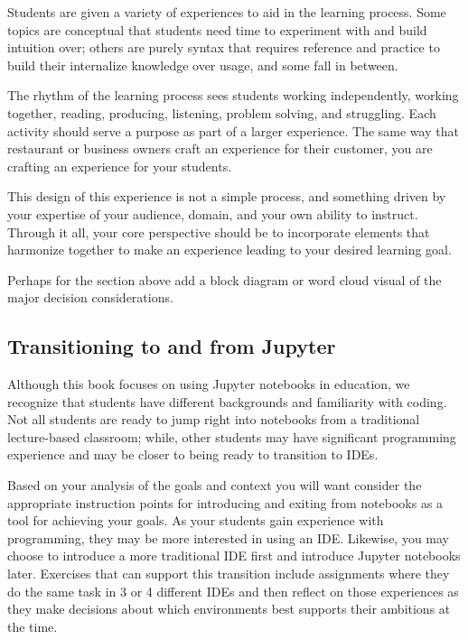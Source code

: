 \documentclass[]{book}
\begin{document}
Students are given a variety of experiences to aid in the learning
process. Some topics are conceptual that students need time to
experiment with and build intuition over; others are purely syntax that
requires reference and practice to build their internalize knowledge
over usage, and some fall in between.

The rhythm of the learning process sees students working independently,
working together, reading, producing, listening, problem solving, and
struggling. Each activity should serve a purpose as part of a larger
experience. The same way that restaurant or business owners craft an
experience for their customer, you are crafting an experience for your
students.

This design of this experience is not a simple process, and something
driven by your expertise of your audience, domain, and your own ability
to instruct. Through it all, your core perspective should be to
incorporate elements that harmonize together to make an experience
leading to your desired learning goal.

Perhaps for the section above add a block diagram or word cloud visual
of the major decision considerations.

\subsection{Transitioning to and from
Jupyter}\label{transitioning-to-and-from-jupyter}

Although this book focuses on using Jupyter notebooks in education, we
recognize that students have different backgrounds and familiarity with
coding. Not all students are ready to jump right into notebooks from a
traditional lecture-based classroom; while, other students may have
significant programming experience and may be closer to being ready to
transition to IDEs.

Based on your analysis of the goals and context you will want consider
the appropriate instruction points for introducing and exiting from
notebooks as a tool for achieving your goals. As your students gain
experience with programming, they may be more interested in using an
IDE. Likewise, you may choose to introduce a more traditional IDE first
and introduce Jupyter notebooks later. Exercises that can support this
transition include assignments where they do the same task in 3 or 4
different IDEs and then reflect on those experiences as they make
decisions about which environments best supports their ambitions at the
time.
\end{document}
